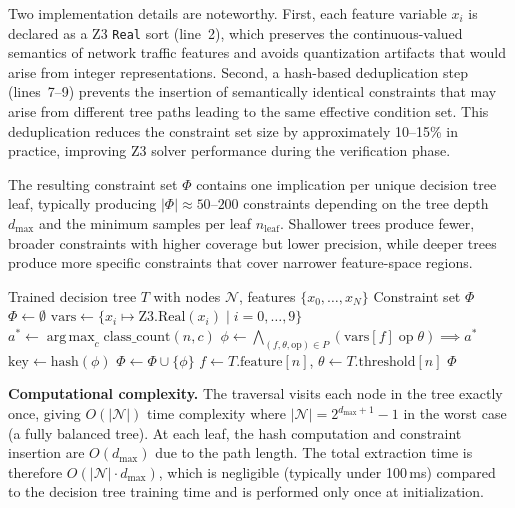 \documentclass[12pt, letterpaper, oneside]{report}
\newcommand{\argmax}{\operatorname*{arg\,max}}
\begin{document}
Two implementation details are noteworthy. First, each feature variable $x_i$ is declared as a Z3 \texttt{Real} sort (line~2), which preserves the continuous-valued semantics of network traffic features and avoids quantization artifacts that would arise from integer representations. Second, a hash-based deduplication step (lines~7--9) prevents the insertion of semantically identical constraints that may arise from different tree paths leading to the same effective condition set. This deduplication reduces the constraint set size by approximately 10--15\% in practice, improving Z3 solver performance during the verification phase.

The resulting constraint set $\Phi$ contains one implication per unique decision tree leaf, typically producing $|\Phi| \approx 50$--$200$ constraints depending on the tree depth $d_{\max}$ and the minimum samples per leaf $n_{\text{leaf}}$. Shallower trees produce fewer, broader constraints with higher coverage but lower precision, while deeper trees produce more specific constraints that cover narrower feature-space regions.

\begin{algorithm}[htbp]
\caption{Z3 Constraint Extraction from Decision Tree}
\label{alg:z3_extract}
\begin{algorithmic}[1]
\Require Trained decision tree $T$ with nodes $\mathcal{N}$, features $\{x_0, \ldots, x_N\}$
\Ensure Constraint set $\Phi$
\State $\Phi \leftarrow \emptyset$
\State $\text{vars} \leftarrow \{x_i \mapsto \text{Z3.Real}(x_i) \mid i = 0, \ldots, 9\}$
        \State $a^* \leftarrow \argmax_c \text{class\_count}(n, c)$  
        \State $\phi \leftarrow \bigwedge_{(f, \theta, \text{op}) \in P} (\text{vars}[f] \;\text{op}\; \theta) \implies a^*$
        \State $\text{key} \leftarrow \text{hash}(\phi)$
            \State $\Phi \leftarrow \Phi \cup \{\phi\}$
        \EndIf
    \Else
        \State $f \leftarrow T.\text{feature}[n]$, \quad $\theta \leftarrow T.\text{threshold}[n]$
        \State {}
        \State {}
    \EndIf
\EndProcedure
\State {}
\State \Return $\Phi$
\end{algorithmic}
\end{algorithm}

\textbf{Computational complexity.} The traversal visits each node in the tree exactly once, giving $O(|\mathcal{N}|)$ time complexity where $|\mathcal{N}| = 2^{d_{\max}+1} - 1$ in the worst case (a fully balanced tree). At each leaf, the hash computation and constraint insertion are $O(d_{\max})$ due to the path length. The total extraction time is therefore $O(|\mathcal{N}| \cdot d_{\max})$, which is negligible (typically under 100\,ms) compared to the decision tree training time and is performed only once at initialization.
\end{document}
